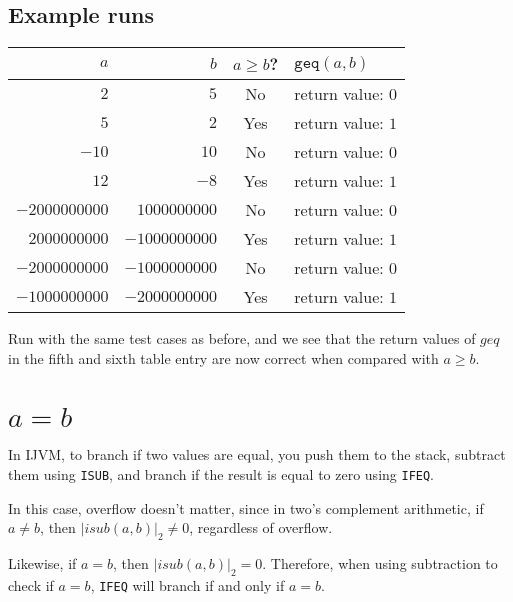 \documentclass[12pt,a4paper]{article}
\begin{document}
\subsection{Example runs}

\begin{tabular}{rrcl}
	$a$ & $b$ & $a\geq b$? & $\texttt{geq}(a, b)$ \\
	\hline
	$2$ & $5$ & No & return value: $0$ \\
	$5$ & $2$ & Yes & return value: $1$ \\
	$-10$ & $10$ & No & return value: $0$ \\
	$12$ & $-8$ & Yes & return value: $1$ \\
	$-2000000000$ & $1000000000$ & No & return value: $0$ \\
	$2000000000$ & $-1000000000$ & Yes & return value: $1$ \\
	$-2000000000$ & $-1000000000$ & No & return value: $0$ \\
	$-1000000000$ & $-2000000000$ & Yes & return value: $1$
\end{tabular}

Run with the same test cases as before, and we see that the return values of
$geq$ in the fifth and sixth table entry are now correct when compared with
$a\geq b$.
\section{$a=b$}
In IJVM, to branch if two values are equal, you push them to the stack,
subtract them using \texttt{ISUB}, and branch if the result is equal to zero
using \texttt{IFEQ}.

In this case, overflow doesn't matter, since in two's complement arithmetic, if
$a\ne b$, then $|isub(a, b)|_2\ne 0$, regardless of overflow.

Likewise, if $a=b$, then $|isub(a, b)|_2=0$. Therefore, when using subtraction
to check if $a=b$, \texttt{IFEQ} will branch if and only if $a=b$.
\end{document}
